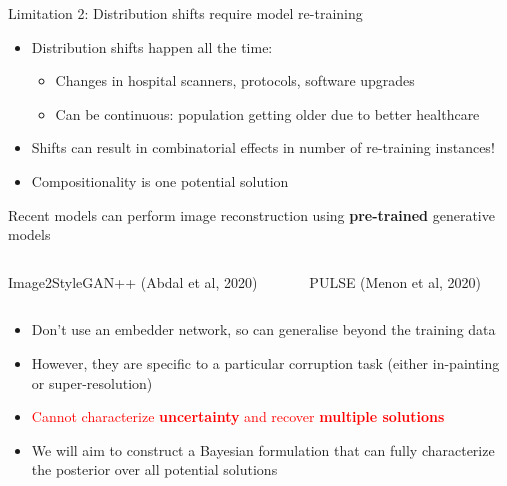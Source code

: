 \documentclass[8pt,xcolor=table,aspectratio=169]{beamer}
\begin{document}
\begin{frame}{Limitation 2: Distribution shifts require model re-training}


\begin{itemize}
 \item Distribution shifts happen all the time:
 \begin{itemize}
 \item Changes in hospital scanners, protocols, software upgrades
 \item Can be continuous: population getting older due to better healthcare
\end{itemize}

\vt
 \item Shifts can result in combinatorial effects in number of re-training instances!

\vt
 
 \item Compositionality is one potential solution
 
\end{itemize}

\begin{center}
\end{center}
 
\end{frame}

\begin{frame}{Recent models can perform image reconstruction using \textbf{pre-trained} generative models}
 

 
\begin{columns}[t]
 \begin{column}{0.6\textwidth}
\centering
Image2StyleGAN++ (Abdal et al, 2020)\\
 \end{column}

 \begin{column}{0.3\textwidth}
  \centering
  PULSE (Menon et al, 2020)\\
 
 \end{column}
\end{columns} 

\vspace{2em}

\begin{itemize}
 \item Don't use an embedder network, so can generalise beyond the training data
 \item However, they are specific to a particular corruption task (either in-painting or super-resolution)
 \item \textcolor{red}{Cannot characterize \textbf{uncertainty} and recover \textbf{multiple solutions}}
 \item We will aim to construct a Bayesian formulation that can fully characterize the posterior over all potential solutions
\end{itemize}


 
 
\end{frame}
\end{document}

